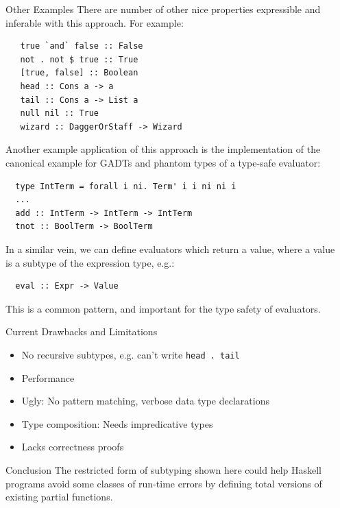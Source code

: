 \documentclass[final]{beamer}
\begin{document}
\begin{frame}[fragile]
\begin{columns}
\begin{column}{.33\textwidth}
\end{column}

\begin{column}{.285\textwidth}
\begin{block}{Other Examples}
\vspace{0.5cm}
There are number of other nice properties expressible and inferable with this
approach. For example:

\begin{verbatim}
   true `and` false :: False
   not . not $ true :: True
   [true, false] :: Boolean
   head :: Cons a -> a
   tail :: Cons a -> List a
   null nil :: True
   wizard :: DaggerOrStaff -> Wizard
\end{verbatim}

Another example application of this approach is the implementation of the
canonical example for GADTs and phantom types of a type-safe evaluator:

\begin{verbatim}
  type IntTerm = forall i ni. Term' i i ni ni i
  ...
  add :: IntTerm -> IntTerm -> IntTerm
  tnot :: BoolTerm -> BoolTerm 
\end{verbatim}

In a similar vein, we can define evaluators which return a value, where a value
is a subtype of the expression type, e.g.:

\begin{verbatim}
  eval :: Expr -> Value
\end{verbatim}

This is a common pattern, and important for the type safety of evaluators. 

\end{block}
\vspace{3cm}
\begin{block}{Current Drawbacks and Limitations}
\vspace{0.5cm}
\begin{itemize}
\item No recursive subtypes, e.g. can't write \texttt{head . tail}
\item Performance
\item Ugly: No pattern matching, verbose data type declarations 
\item Type composition: Needs impredicative types
\item Lacks correctness proofs
\end{itemize}
\end{block}
\vspace{3cm}
\begin{block}{Conclusion}
The restricted form of subtyping shown here could help Haskell programs avoid
some classes of run-time errors by defining total versions of existing partial
functions. 
\end{block}
\end{column}
\end{columns}
\end{frame}
\end{document}
